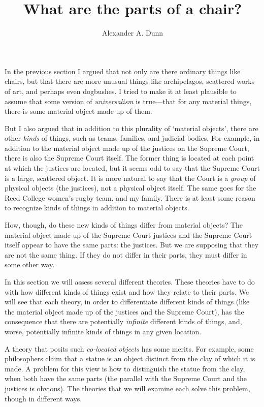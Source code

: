 \documentclass[11pt]{article}
\title{What are the parts of a chair?}
\author{Alexander A. Dunn}
\begin{document}
\ifstandalone
\maketitle
\begin{spacing}{1.5}
\fi

\label{parts}

In the previous section I argued that not only are there ordinary
things like chairs, but that there are more unusual things like
archipelagos, scattered works of art, and perhaps even dogbushes.  I
tried to make it at least plausible to assume that some version of
{\em universalism} is true---that for any material things, there is
some material object made up of them.

But I also argued that in addition to this plurality of `material
objects', there are other {\em kinds} of things, such as teams,
families, and judicial bodies.  For example, in addition to the
material object made up of the justices on the Supreme Court, there is
also the Supreme Court itself.  The former thing is located at each
point at which the justices are located, but it seems odd to say that
the Supreme Court is a large, scattered object.  It is more natural to
say that the Court is a {\em group} of physical objects (the
justices), not a physical object itself.  The same goes for the Reed
College women's rugby team, and my family.  There is at least some
reason to recognize kinds of things in addition to material objects.

How, though, do these new kinds of things differ from material
objects?  The material object made up of the Supreme Court justices
and the Supreme Court itself appear to have the same parts: the
justices.  But we are supposing that they are not the same thing.  If
they do not differ in their parts, they must differ in some other way.

In this section we will assess several different theories.  These
theories have to do with how different kinds of things exist and how
they relate to their parts.  We will see that each theory, in order to
differentiate different kinds of things (like the material object made
up of the justices and the Supreme Court), has the consequence that
there are potentially {\em infinite} different kinds of things, and,
worse, potentially infinite kinds of things in any given location.

A theory that posits such {\em co-located objects} has some merits.
For example, some philosophers claim that a statue is an object
distinct from the clay of which it is made.  A problem for this view
is how to distinguish the statue from the clay, when both have the
same parts (the parallel with the Supreme Court and the justices is
obvious).  The theories that we will examine each solve this problem,
though in different ways.


\end{spacing}
\end{document}
